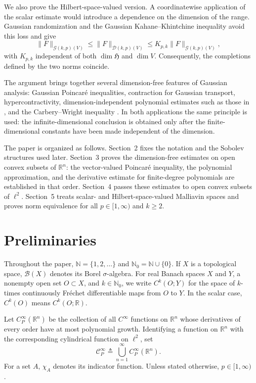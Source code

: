 \documentclass[12pt]{article}
\theoremstyle{plain}
\theoremstyle{definition}
\theoremstyle{remark}
\numberwithin{equation}{section}
\newcommand{\nn}{\mathbb{N}}
\newcommand{\rr}{\mathbb{R}}
\newcommand{\Nzero}{\mathbb{N}_{0}}
\begin{document}
We also prove the Hilbert-space-valued version.  A coordinatewise application of the scalar estimate would introduce a dependence on the dimension of the range.  Gaussian randomization and the Gaussian Kahane--Khintchine inequality \cite{HNVW} avoid this loss and give
\[
\|F\|_{\mathcal G(k,p)(V)}
\leqslant
\|F\|_{\mathcal D(k,p)(V)}
\leqslant
K_{p,k}\|F\|_{\mathcal G(k,p)(V)},
\]
with $K_{p,k}$ independent of both $\dim\mathfrak H$ and $\dim V$.  Consequently, the completions defined by the two norms coincide.

The argument brings together several dimension-free features of Gaussian analysis: Gaussian Poincar\'e inequalities, contraction for Gaussian transport, hypercontractivity, dimension-independent polynomial estimates such as those in \cite{EI}, and the Carbery--Wright inequality \cite{CW}.  In both applications the same principle is used: the infinite-dimensional conclusion is obtained only after the finite-dimensional constants have been made independent of the dimension.

The paper is organized as follows.  Section~2 fixes the notation and the Sobolev structures used later.  Section~3 proves the dimension-free estimates on open convex subsets of $\rr^n$: the vector-valued Poincar\'e inequality, the polynomial approximation, and the derivative estimate for finite-degree polynomials are established in that order.  Section~4 passes these estimates to open convex subsets of $\ell^2$.  Section~5 treats scalar- and Hilbert-space-valued Malliavin spaces and proves norm equivalence for all $p\in[1,\infty)$ and $k\geqslant2$.


\section{Preliminaries}

Throughout the paper, $\nn=\{1,2,\ldots\}$ and $\Nzero=\nn\cup\{0\}$.  If $X$ is a topological space, $\mathscr B(X)$ denotes its Borel $\sigma$-algebra.  For real Banach spaces $X$ and $Y$, a nonempty open set $O\subset X$, and $k\in\Nzero$, we write $C^k(O;Y)$ for the space of $k$-times continuously Fr\'echet differentiable maps from $O$ to $Y$.  In the scalar case, $C^k(O)$ means $C^k(O;\rr)$.

Let $C_P^\infty(\rr^n)$ be the collection of all $C^\infty$ functions on $\rr^n$ whose derivatives of every order have at most polynomial growth.  Identifying a function on $\rr^n$ with the corresponding cylindrical function on $\ell^2$, set
\[
\mathscr C_P^\infty
\triangleq
\bigcup_{n=1}^\infty C_P^\infty(\rr^n).
\]
For a set $A$, $\chi_A$ denotes its indicator function.  Unless stated otherwise, $p\in[1,\infty)$.
\end{document}
